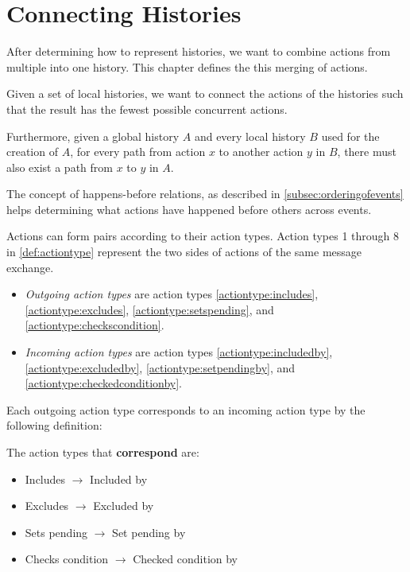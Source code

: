 \chapter{Connecting Histories} 
\label{chap:connecting-histories}
	After determining how to represent histories, we want to combine actions from multiple into one history. This chapter defines the this merging of actions.
	
    \newpar
    Given a set of local histories, we want to connect the actions of the histories such that the result has the fewest possible concurrent actions. 
    
    Furthermore, given a global history $A$ and every local history $B$ used for the creation of $A$, for every path from action $x$ to another action $y$ in $B$, there must also exist a path from $x$ to $y$ in $A$.
    
    
    \newpar
    The concept of happens-before relations, as described in \autoref{subsec:orderingofevents} helps determining what actions have happened before others across events.
	
    \newpar
	Actions can form pairs according to their action types. Action types 1 through 8 in \autoref{def:actiontype} represent the two sides of actions of the same message exchange.
	
	\begin{itemize}
		\item \textit{Outgoing action types} are action types \ref{actiontype:includes}, \ref{actiontype:excludes}, \ref{actiontype:setspending}, and \ref{actiontype:checkscondition}.
		\item \textit{Incoming action types} are action types \ref{actiontype:includedby}, \ref{actiontype:excludedby}, \ref{actiontype:setpendingby}, and \ref{actiontype:checkedconditionby}. 
	\end{itemize}
		
	\noindent Each outgoing action type corresponds to an incoming action type by the following definition:
	
	\begin{definition}
		\label{def:happensbeforeaction}
		The action types that \textbf{correspond} are:
			\begin{itemize}
				\item Includes $\rightarrow$ Included by
				\item Excludes $\rightarrow$ Excluded by
				\item Sets pending $\rightarrow$ Set pending by
				\item Checks condition $\rightarrow$ Checked condition by
			\end{itemize}
	\end{definition}
	
